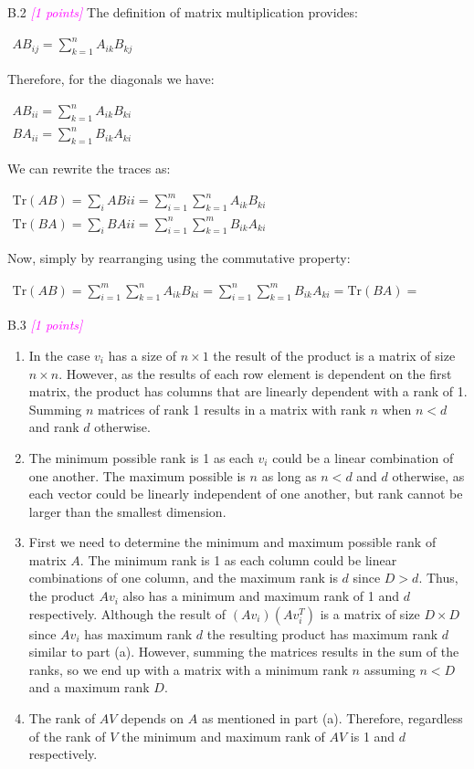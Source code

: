 \documentclass{article}
\newcommand{\1}{\mathbf{1}}
\newcommand{\points}[1]{\small\textcolor{magenta}{\emph{[#1 points]}} \normalsize}
\begin{document}
B.2 \points{1} The definition of matrix multiplication provides:
\begin{center}
	$\begin{aligned}AB_{ij}=\sum_{k=1}^{n}A_{ik}B_{kj}\end{aligned}$
\end{center}
Therefore, for the diagonals we have:
\begin{center}
	$\begin{aligned}AB_{ii}=\sum_{k=1}^{n}A_{ik}B_{ki}\\
	BA_{ii}=\sum_{k=1}^{n}B_{ik}A_{ki}	\end{aligned}$
\end{center}
We can rewrite the traces as:
\begin{center}
	$\begin{aligned}\text{Tr}(AB)=\sum_{i}ABii=\sum_{i=1}^{m}\sum_{k=1}^{n}A_{ik}B_{ki}\\
	\text{Tr}(BA)=\sum_{i}BAii=\sum_{i=1}^{n}\sum_{k=1}^{m}B_{ik}A_{ki}	\end{aligned}$
\end{center}
Now, simply by rearranging using the commutative property:
\begin{center}
	$\begin{aligned}\text{Tr}(AB)=\sum_{i=1}^{m}\sum_{k=1}^{n}A_{ik}B_{ki}=\sum_{i=1}^{n}\sum_{k=1}^{m}B_{ik}A_{ki}=\text{Tr}(BA)=	\end{aligned}$
\end{center}

B.3 \points{1} 
    \begin{enumerate}
        \item In the case $v_i$ has a size of $n\times 1$ the result of the product is a matrix of size $n\times n$. However, as the results of each row element is dependent on the first matrix, the product has columns that are linearly dependent with a rank of 1. Summing $n$ matrices of rank 1 results in a matrix with rank $n$ when $n<d$ and rank $d$ otherwise. 
        \item The minimum possible rank is 1 as each $v_i$ could be a linear combination of one another. The maximum possible is $n$ as long as $n< d$ and $d$ otherwise, as each vector could be linearly independent of one another, but rank cannot be larger than the smallest dimension. 
        \item First we need to determine the minimum and maximum possible rank of matrix $A$. The minimum rank is 1 as each column could be linear combinations of one column, and the maximum rank is $d$ since $D>d$. Thus, the product $Av_i$ also has a minimum and maximum rank of 1 and $d$ respectively. Although the result of $(Av_i)(Av_i^T)$ is a matrix of size $D\times D$ since $Av_i$ has maximum rank $d$ the resulting product has maximum rank $d$ similar to part (a). However, summing the matrices results in the sum of the ranks, so we end up with a matrix with a minimum rank $n$ assuming $n<D$ and a maximum rank $D$.   
        \item The rank of $AV$ depends on $A$ as mentioned in part (a). Therefore, regardless of the rank of $V$ the minimum and maximum rank of $AV$ is 1 and $d$ respectively. 
    \end{enumerate}
\end{document}
